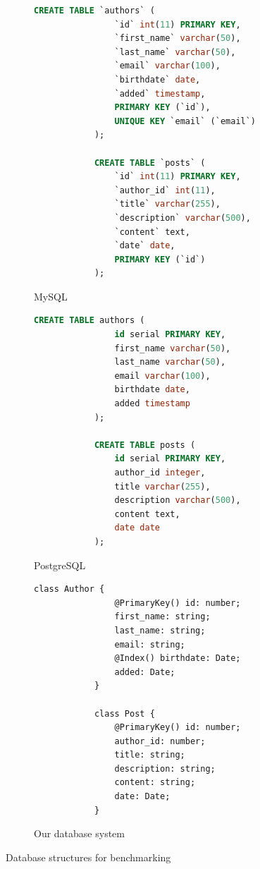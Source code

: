 \begin{figure}[h]
    \begin{subfigure}[t]{.3\textwidth}
        \begin{lstlisting}[language=SQL,basicstyle=\tiny]
            CREATE TABLE `authors` (
                `id` int(11) PRIMARY KEY,
                `first_name` varchar(50),
                `last_name` varchar(50),
                `email` varchar(100),
                `birthdate` date,
                `added` timestamp,
                PRIMARY KEY (`id`),
                UNIQUE KEY `email` (`email`)
            );

            CREATE TABLE `posts` (
                `id` int(11) PRIMARY KEY,
                `author_id` int(11),
                `title` varchar(255),
                `description` varchar(500),
                `content` text,
                `date` date,
                PRIMARY KEY (`id`)
            );
        \end{lstlisting}
        \caption{MySQL}
    \end{subfigure}%
    \begin{subfigure}[t]{.3\textwidth}
        \begin{lstlisting}[language=SQL,basicstyle=\tiny]
            CREATE TABLE authors (
                id serial PRIMARY KEY,
                first_name varchar(50),
                last_name varchar(50),
                email varchar(100),
                birthdate date,
                added timestamp
            );

            CREATE TABLE posts (
                id serial PRIMARY KEY,
                author_id integer,
                title varchar(255),
                description varchar(500),
                content text,
                date date
            );
        \end{lstlisting}
        \caption{PostgreSQL}
    \end{subfigure}
    \begin{subfigure}[t]{.3\textwidth}
        \begin{lstlisting}[style=ES6,basicstyle=\tiny]
            class Author {
                @PrimaryKey() id: number;
                first_name: string;
                last_name: string;
                email: string;
                @Index() birthdate: Date;
                added: Date;
            }

            class Post {
                @PrimaryKey() id: number;
                author_id: number;
                title: string;
                description: string;
                content: string;
                date: Date;
            }
        \end{lstlisting}
        \caption{Our database system}
    \end{subfigure}
    \caption{Database structures for benchmarking}
    \label{benchDatabaseStructure}
\end{figure}


